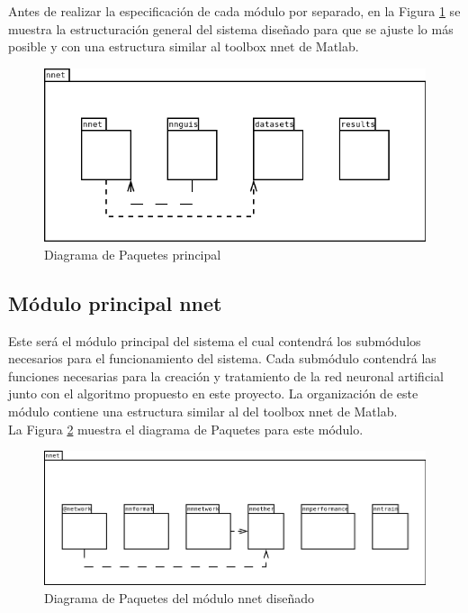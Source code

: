 		Antes de realizar la especificación de cada módulo por separado, en la Figura \ref{fig:paquetes0} se muestra la estructuración general del sistema diseñado para que se ajuste lo más posible y con una estructura similar al toolbox nnet de Matlab.
		
		\begin{figure}[h]
			\centering
			\includegraphics[scale=0.6]{uml/DiagramaPaquetes0.png}
			\caption{Diagrama de Paquetes principal}
			\label{fig:paquetes0}
		\end{figure}
		
		\subsection{Módulo principal nnet}
		
			Este será el módulo principal del sistema el cual contendrá los submódulos necesarios para el funcionamiento del sistema. Cada submódulo contendrá las funciones necesarias para la creación y tratamiento de la red neuronal artificial junto con el algoritmo propuesto en este proyecto. La organización de este módulo contiene una estructura similar al del toolbox nnet de Matlab.\\
			
			La Figura \ref{fig:paquetes1} muestra el diagrama de Paquetes para este módulo.
			
			\begin{figure}[h]
				\centering
				\includegraphics[scale=0.5]{uml/DiagramaPaquetes1.png}
				\caption{Diagrama de Paquetes del módulo nnet diseñado}
				\label{fig:paquetes1}
			\end{figure}
			
